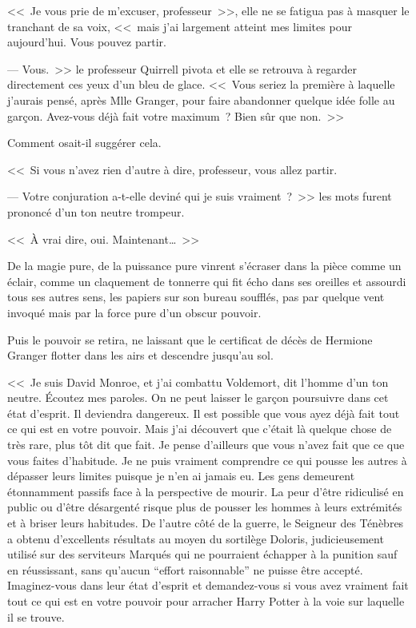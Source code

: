 <<~Je vous prie de m'excuser, professeur~>>, elle ne se fatigua pas à masquer le tranchant de sa voix, <<~mais j'ai largement atteint mes limites pour aujourd'hui. Vous pouvez partir.

--- Vous.~>> le professeur Quirrell pivota et elle se retrouva à regarder directement ces yeux d'un bleu de glace. <<~Vous seriez la première à laquelle j'aurais pensé, après Mlle Granger, pour faire abandonner quelque idée folle au garçon. Avez-vous déjà fait votre maximum~? Bien sûr que non.~>>

Comment osait-il suggérer cela.

<<~Si vous n'avez rien d'autre à dire, professeur, vous allez partir.

--- Votre conjuration a-t-elle deviné qui je suis vraiment~?~>> les mots furent prononcé d'un ton neutre trompeur.

<<~À vrai dire, oui. Maintenant…~>>

De la magie pure, de la puissance pure vinrent s'écraser dans la pièce comme un éclair, comme un claquement de tonnerre qui fit écho dans ses oreilles et assourdi tous ses autres sens, les papiers sur son bureau soufflés, pas par quelque vent invoqué mais par la force pure d'un obscur pouvoir.

Puis le pouvoir se retira, ne laissant que le certificat de décès de Hermione Granger flotter dans les airs et descendre jusqu'au sol.

<<~Je suis David Monroe, et j'ai combattu Voldemort, dit l'homme d'un ton neutre. Écoutez mes paroles. On ne peut laisser le garçon poursuivre dans cet état d'esprit. Il deviendra dangereux. Il est possible que vous ayez déjà fait tout ce qui est en votre pouvoir. Mais j'ai découvert que c'était là quelque chose de très rare, plus tôt dit que fait. Je pense d'ailleurs que vous n'avez fait que ce que vous faites d'habitude. Je ne puis vraiment comprendre ce qui pousse les autres à dépasser leurs limites puisque je n'en ai jamais eu. Les gens demeurent étonnamment passifs face à la perspective de mourir. La peur d'être ridiculisé en public ou d'être désargenté risque plus de pousser les hommes à leurs extrémités et à briser leurs habitudes. De l'autre côté de la guerre, le Seigneur des Ténèbres a obtenu d'excellents résultats au moyen du sortilège Doloris, judicieusement utilisé sur des serviteurs Marqués qui ne pourraient échapper à la punition sauf en réussissant, sans qu'aucun “effort raisonnable” ne puisse être accepté. Imaginez-vous dans leur état d'esprit et demandez-vous si vous avez vraiment fait tout ce qui est en votre pouvoir pour arracher Harry Potter à la voie sur laquelle il se trouve.

